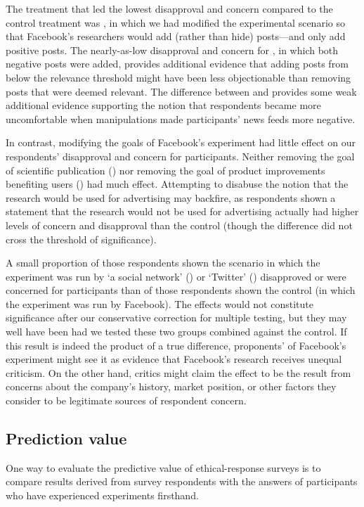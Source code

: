 The treatment that led the lowest disapproval and concern compared to the control treatment was , in which we had modified the experimental scenario so that Facebook's researchers would add (rather than hide) posts---and only add positive posts.  The nearly-as-low disapproval and concern for , in which both negative posts were added, provides additional evidence that adding posts from below the relevance threshold might have been less objectionable than removing posts that were deemed relevant.  The difference between  and  provides some weak additional evidence supporting the notion that respondents became more uncomfortable when manipulations made participants' news feeds more negative.

In contrast, modifying the goals of Facebook's experiment had little effect on our respondents' disapproval and concern for participants.  Neither removing the goal of scientific publication () nor removing the goal of product improvements benefiting users () had much effect.  Attempting to disabuse the notion that the research would be used for advertising may backfire, as respondents shown a statement that the research would not be used for advertising actually had higher levels of concern and disapproval than the control (though the difference did not cross the threshold of significance).

A small proportion of those respondents shown the scenario in which the experiment was run by `a social network' () or `Twitter' () disapproved or were concerned for participants than of those respondents shown the control (in which the experiment was run by Facebook).  The effects would not constitute significance after our conservative correction for multiple testing, but they may well have been had we tested these two groups combined against the control.  If this result is indeed the product of a true difference, proponents' of Facebook's experiment might see it as evidence that Facebook's research receives unequal criticism.  On the other hand, critics might claim the effect to be the result from concerns about the company's history, market position, or other factors they consider to be legitimate sources of respondent concern.

%

\subsection{Prediction value}
One way to evaluate the predictive value of ethical-response surveys is to compare results derived from survey respondents with the answers of participants who have experienced experiments firsthand.

